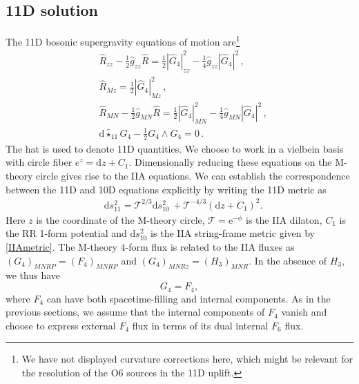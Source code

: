 \documentclass[11pt]{article}
\renewcommand{\[}{\left[}
\renewcommand{\]}{\right]}
\renewcommand{\(}{\left(}
\renewcommand{\)}{\right)}
\newcommand{\w}{\wedge}
\renewcommand{\d}{\textrm{d}}
\newcommand{\e}{\textrm{e}}
\newcommand{\<}{\langle}
\renewcommand{\>}{\rangle}
\begin{document}
\subsection{11D solution}

The 11D bosonic supergravity equations of motion are\footnote{We have not displayed curvature corrections here, which might be relevant for the resolution of the O6 sources in the 11D uplift.}
\begin{align}
& \hat R_{zz} - \frac{1}{2}\hat g_{zz}\hat R = \frac{1}{2}|\hat G_4|^2_{zz}-\frac{1}{4}\hat g_{zz} |\hat G_4|^2\,, \label{11deinstein1} \\
& \hat R_{Mz} = \frac{1}{2}|\hat G_4|^2_{Mz}\,, \\
& \hat R_{MN} - \frac{1}{2}\hat g_{MN}\hat R = \frac{1}{2}|\hat G_4|^2_{MN}-\frac{1}{4}\hat g_{MN} |\hat G_4|^2\,, \label{11deinstein2} \\
& \d \hat \star_{11} G_4 - \frac{1}{2}G_4 \w G_4 = 0\,.
\end{align}
The hat is used to denote 11D quantities. We choose to work in a vielbein basis with circle fiber $e^z=\d z+C_1$.
Dimensionally reducing these equations on the M-theory circle gives rise to the IIA equations. We can establish the correspondence between the 11D and 10D equations explicitly by writing the 11D metric as
\begin{align}
&\d s_{11}^2 =  \mathcal{T}^{2/3} \d s_{10}^2\, + \mathcal{T}^{-4/3} \left( \d z + C_1\right)^2. \label{eq:UpliftMetric}
\end{align}
Here $z$ is the coordinate of the M-theory circle, $\mathcal{T}=\e^{-\phi}$ is the IIA dilaton, $C_1$ is the RR 1-form potential and $\d s_{10}^2$ is the IIA string-frame metric given by \eqref{IIAmetric}. The M-theory 4-form flux is related to the IIA fluxes as $(G_4)_{MNRP}=(F_4)_{MNRP}$ and $(G_4)_{MNRz}=(H_3)_{MNR}$.
In the absence of $H_3$, we thus have
\begin{equation}
G_4 = F_4,
\end{equation}
where $F_4$ can have both spacetime-filling and internal components. As in the previous sections, we assume that the internal components of $F_4$ vanish and choose to express external $F_4$ flux in terms of its dual internal $F_6$ flux.
\end{document}

